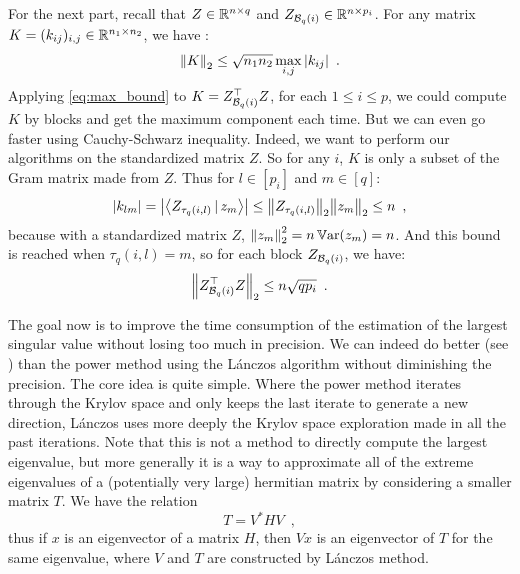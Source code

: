 \documentclass[../main.tex]{subfiles}
\begin{document}
For the next part, recall that $Z\in\mathbb{R}^{n\times q}$ and
$Z_{\mathcal{B}_{q}(i)}\in\mathbb{R}^{n\times p_i}$.
For any matrix $K=(k_{ij})_{i,j}\in\mathbb{R}^{n_1\times n_2}$, we have
\citep[p.~27]{vandebril07}:
\begin{align}\label{eq:max_bound}
\left \lVert K \right \rVert_2 \leq \sqrt{n_1n_2}\max_{i,j} |k_{ij}| \enspace.
\end{align}
Applying \eqref{eq:max_bound} to $K=Z_{\mathcal{B}_{q}(i)}^\top Z$, for each
$1\leq i\leq p$, we could compute $K$ by blocks and get the maximum component
each time.
But we can even go faster using Cauchy-Schwarz inequality.
Indeed, we want to perform our algorithms on the standardized matrix $Z$.
So for any $i$, $K$ is only a subset of the Gram matrix made from $Z$.
Thus for $l\in[p_i]$ and $m\in[q]$:
\begin{align*}
|k_{lm}| = \left \vert 
\left\langle Z_{\tau_q(i,l)}\, |\,  z_m\right\rangle
 \right \vert
\leq \big \lVert Z_{\tau_q(i,l)} \big \rVert_2 \big \lVert z_m \big \rVert_2 \leq n
\enspace,
\end{align*}
because with a standardized matrix $Z$, $\left \lVert z_m \right \rVert_2^2 = n \operatorname{\mathbb{V} ar}(z_m)=n$.
And this bound is reached when $\tau_q(i, l)=m$, so for each block
$Z_{\mathcal{B}_{q}(i)}$, we have:
\[\left \lVert Z_{\mathcal{B}_{q}(i)}^\top Z \right \rVert_2 \leq n\sqrt{q p_i} \enspace.\]

The goal now is to improve the time consumption of the estimation of the largest
singular value without losing too much in precision.
We can indeed do better (see ) than the power method using the
L\'{a}nczos algorithm  without diminishing the precision.
The core idea is quite simple. Where the power method iterates through the
Krylov space and only keeps the last iterate to generate a new direction,
L\'{a}nczos uses more deeply the Krylov space exploration made in all the past
iterations.
Note that this is not a method to directly compute the largest eigenvalue, but
more generally it is a way to approximate all of the extreme eigenvalues of a
(potentially very large) hermitian matrix by considering a smaller matrix $T$.
We have the relation \[T = V^* H V\enspace,\]
thus if $x$ is an eigenvector of a matrix $H$, then $Vx$ is an eigenvector of
$T$ for the same eigenvalue, where $V$ and $T$ are constructed by L\'{a}nczos
method.
\medskip
\end{document}
